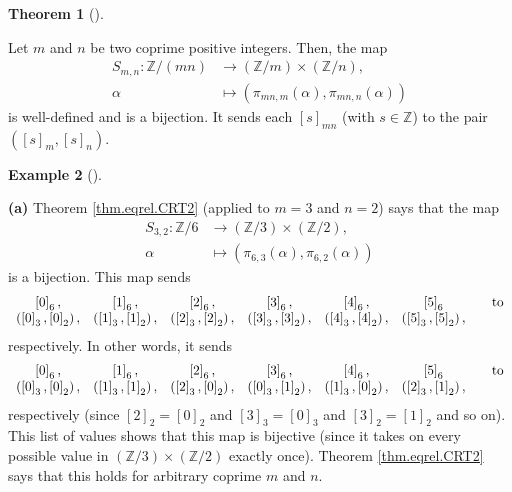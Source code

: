 \documentclass[numbers=enddot,12pt,final,onecolumn,notitlepage]{scrartcl}%
\numberwithin{exer}{subsection}
\theoremstyle{definition}
\newtheorem{theo}{Theorem}[subsection]
\newenvironment{theorem}[1][]
{\begin{theo}[#1]\begin{leftbar}}
{\end{leftbar}\end{theo}}
\newtheorem{exam}[theo]{Example}
\newenvironment{example}[1][]
{\begin{exam}[#1]\begin{leftbar}}
{\end{leftbar}\end{exam}}
\begin{document}
\begin{theorem}
\label{thm.eqrel.CRT2}Let $m$ and $n$ be two coprime positive integers. Then,
the map%
\begin{align*}
S_{m,n}:\mathbb{Z}/\left(  mn\right)   &  \rightarrow\left(  \mathbb{Z}%
/m\right)  \times\left(  \mathbb{Z}/n\right)  ,\\
\alpha &  \mapsto\left(  \pi_{mn,m}\left(  \alpha\right)  ,\pi_{mn,n}\left(
\alpha\right)  \right)
\end{align*}
is well-defined and is a bijection. It sends each $\left[  s\right]  _{mn}$
(with $s\in\mathbb{Z}$) to the pair $\left(  \left[  s\right]  _{m},\left[
s\right]  _{n}\right)  $.
\end{theorem}

\begin{example}
\textbf{(a)} Theorem \ref{thm.eqrel.CRT2} (applied to $m=3$ and $n=2$) says
that the map%
\begin{align*}
S_{3,2}:\mathbb{Z}/6  &  \rightarrow\left(  \mathbb{Z}/3\right)  \times\left(
\mathbb{Z}/2\right)  ,\\
\alpha &  \mapsto\left(  \pi_{6,3}\left(  \alpha\right)  ,\pi_{6,2}\left(
\alpha\right)  \right)
\end{align*}
is a bijection. This map sends%
\[%
\begin{array}
[c]{cccccccc}%
\left[  0\right]  _{6}, & \left[  1\right]  _{6}, & \left[  2\right]  _{6}, &
\left[  3\right]  _{6}, & \left[  4\right]  _{6}, & \left[  5\right]  _{6} &
& \text{to}\\
\left(  \left[  0\right]  _{3},\left[  0\right]  _{2}\right)  , & \left(
\left[  1\right]  _{3},\left[  1\right]  _{2}\right)  , & \left(  \left[
2\right]  _{3},\left[  2\right]  _{2}\right)  , & \left(  \left[  3\right]
_{3},\left[  3\right]  _{2}\right)  , & \left(  \left[  4\right]  _{3},\left[
4\right]  _{2}\right)  , & \left(  \left[  5\right]  _{3},\left[  5\right]
_{2}\right)  , &  &
\end{array}
\]
respectively. In other words, it sends%
\[%
\begin{array}
[c]{cccccccc}%
\left[  0\right]  _{6}, & \left[  1\right]  _{6}, & \left[  2\right]  _{6}, &
\left[  3\right]  _{6}, & \left[  4\right]  _{6}, & \left[  5\right]  _{6} &
& \text{to}\\
\left(  \left[  0\right]  _{3},\left[  0\right]  _{2}\right)  , & \left(
\left[  1\right]  _{3},\left[  1\right]  _{2}\right)  , & \left(  \left[
2\right]  _{3},\left[  0\right]  _{2}\right)  , & \left(  \left[  0\right]
_{3},\left[  1\right]  _{2}\right)  , & \left(  \left[  1\right]  _{3},\left[
0\right]  _{2}\right)  , & \left(  \left[  2\right]  _{3},\left[  1\right]
_{2}\right)  , &  &
\end{array}
\]
respectively (since $\left[  2\right]  _{2}=\left[  0\right]  _{2}$ and
$\left[  3\right]  _{3}=\left[  0\right]  _{3}$ and $\left[  3\right]
_{2}=\left[  1\right]  _{2}$ and so on). This list of values shows that this
map is bijective (since it takes on every possible value in $\left(
\mathbb{Z}/3\right)  \times\left(  \mathbb{Z}/2\right)  $ exactly once).
Theorem \ref{thm.eqrel.CRT2} says that this holds for arbitrary coprime $m$
and $n$.


\end{example}
\end{document}

